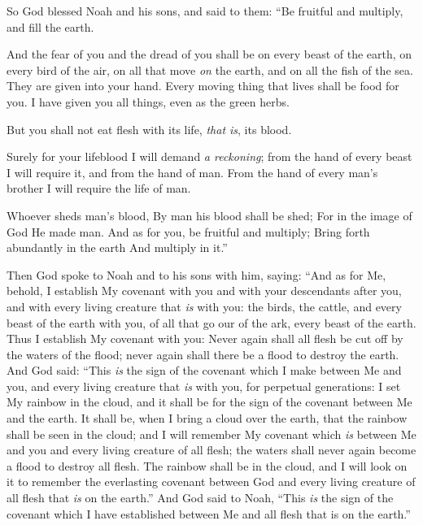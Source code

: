 
\bverse So God blessed Noah and his sons, and said to them: ``Be fruitful and multiply, and fill the earth.

\bverse And the fear of you and the dread of you shall be on every beast of the earth, on every bird of the air, on all that move \textit{on} the earth, and on all the fish of the sea. They are given into your hand.
\bverse Every moving thing that lives shall be food for you. I have given you all things, even as the green herbs.

\bverse But you shall not eat flesh with its life, \textit{that is}, its blood.

\bverse Surely for your lifeblood I will demand \textit{a reckoning}; from the hand of every beast I will require it, and from the hand of man. From the hand of every man's brother I will require the life of man.
\begin{bquotation}
\bverse Whoever sheds man's blood, By man his blood shall be shed; For in the image of God He made man. 
\bverse And as for you, be fruitful and multiply; Bring forth abundantly in the earth And multiply in it.''
\end{bquotation}
\bverse Then God spoke to Noah and to his sons with him, saying:
\bverse ``And as for Me, behold, I establish My covenant with you and with your descendants after you,
\bverse and with every living creature that \textit{is} with you: the birds, the cattle, and every beast of the earth with you, of all that go our of the ark, every beast of the earth.
\bverse Thus I establish My covenant with you: Never again shall all flesh be cut off by the waters of the flood; never again shall there be a flood to destroy the earth.
\bverse And God said: ``This \textit{is} the sign of the covenant which I make between Me and you, and every living creature that \textit{is} with you, for perpetual generations:
\bverse I set My rainbow in the cloud, and it shall be for the sign of the covenant between Me and the earth.
\bverse It shall be, when I bring a cloud over the earth, that the rainbow shall be seen in the cloud;
\bverse and I will remember My covenant which \textit{is} between Me and you and every living creature of all flesh; the waters shall never again become a flood to destroy all flesh.
\bverse The rainbow shall be in the cloud, and I will look on it to remember the everlasting covenant between God and every living creature of all flesh that \textit{is} on the earth.''
\bverse And God said to Noah, ``This \textit{is} the sign of the covenant which I have established between Me and all flesh that is on the earth.''

